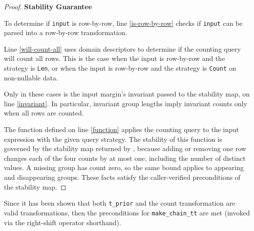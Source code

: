 \documentclass{article}
\begin{document}
\begin{proof}
    \textbf{Stability Guarantee}

    To determine if \texttt{input} is row-by-row,
    line \ref{is-row-by-row} checks if \texttt{input} can be parsed into a row-by-row transformation.

    Line \ref{will-count-all} uses domain descriptors to determine if the counting query will count all rows.
    This is the case when the input is row-by-row and the strategy is \texttt{Len},
    or when the input is row-by-row and the strategy is \texttt{Count} on non-nullable data.

    Only in these cases is the input margin's invariant passed to the stability map, on line \ref{invariant}.
    In particular, invariant group lengths imply invariant counts only when all rows are counted.

    The function defined on line \ref{function} applies the counting query to the input expression with the given query strategy.
    The stability of this function is governed by the stability map returned by ,
    because adding or removing one row changes each of the four counts by at most one, including the number of distinct values.
    A missing group has count zero, so the same bound applies to appearing and disappearing groups.
    These facts satisfy the caller-verified preconditions of the stability map.
\end{proof}

Since it has been shown that both \texttt{t\_prior} and the count transformation are valid transformations,
then the preconditions for \texttt{make\_chain\_tt} are met (invoked via the right-shift operator shorthand).
\end{document}

